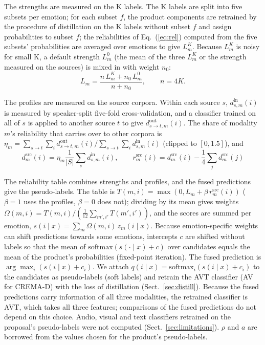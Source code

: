 The strengths are measured on the K labels. The K labels are split into five subsets per emotion; for each subset $f$, the product components are retrained by the procedure of distillation on the K labels without subset $f$ and assign probabilities to subset $f$; the reliabilities of Eq.~(\ref{eq:rel}) computed from the five subsets' probabilities are averaged over emotions to give $L^{K}_m$. Because $L^{K}_m$ is noisy for small K, a default strength $L^{0}_m$ (the mean of the three $L^{K}_m$ or the strength measured on the sources) is mixed in with weight $n_0$:
\begin{equation}
L_m=\frac{n\,L^{K}_m+n_0\,L^{0}_m}{n+n_0},\qquad n=4K.
\end{equation}

The profiles are measured on the source corpora. Within each source $s$, $d^{\mathrm{in}}_{s,m}(i)$ is measured by speaker-split five-fold cross-validation, and a classifier trained on all of $s$ is applied to another source $t$ to give $d^{\mathrm{out}}_{s\to t,m}(i)$. The share of modality $m$'s reliability that carries over to other corpora is $\eta_m=\sum_{s\to t}\sum_i d^{\mathrm{out}}_{s\to t,m}(i)/\sum_{s\to t}\sum_i d^{\mathrm{in}}_{s,m}(i)$ (clipped to $[0,1.5]$), and
\begin{equation}
d^{\mathrm{src}}_m(i)=\eta_m\frac{1}{|S|}\sum_s d^{\mathrm{in}}_{s,m}(i),\qquad r^{\mathrm{src}}_m(i)=d^{\mathrm{src}}_m(i)-\frac14\sum_j d^{\mathrm{src}}_m(j)
\end{equation}

The reliability table combines strengths and profiles, and the fused predictions give the pseudo-labels. The table is $T(m,i)=\max(0,L_m+\beta\,r^{\mathrm{src}}_m(i))$ ($\beta=1$ uses the profiles, $\beta=0$ does not); dividing by its mean gives weights $\Omega(m,i)=T(m,i)/(\frac{1}{12}\sum_{m',i'}T(m',i'))$, and the scores are summed per emotion, $s(i\mid x)=\sum_m \Omega(m,i)\,z_m(i\mid x)$. Because emotion-specific weights can shift predictions towards some emotions, intercepts $c$ are shifted without labels so that the mean of $\mathrm{softmax}(s(\cdot\mid x)+c)$ over candidates equals the mean of the product's probabilities (fixed-point iteration). The fused prediction is $\arg\max_i(s(i\mid x)+c_i)$. We attach $q(i\mid x)=\mathrm{softmax}_i(s(i\mid x)+c_i)$ to the candidates as pseudo-labels (soft labels) and retrain the AVT classifier (AV for CREMA-D) with the loss of distillation (Sect.~\ref{sec:distill}). Because the fused predictions carry information of all three modalities, the retrained classifier is AVT, which takes all three features; comparisons of the fused predictions do not depend on this choice. Audio, visual and text classifiers retrained on the proposal's pseudo-labels were not computed (Sect.~\ref{sec:limitations}). $\rho$ and $a$ are borrowed from the values chosen for the product's pseudo-labels.

